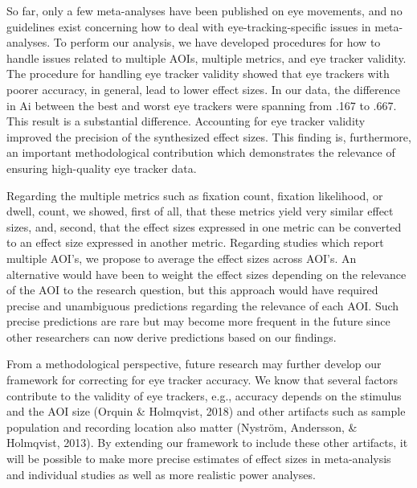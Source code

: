 \documentclass{article}
\begin{document}

So far, only a few meta-analyses have been published on eye movements, and no guidelines exist concerning how to deal with eye-tracking-specific issues in meta-analyses. To perform our analysis, we have developed procedures for how to handle issues related to multiple AOIs, multiple metrics, and eye tracker validity. The procedure for handling eye tracker validity showed that eye trackers with poorer accuracy, in general, lead to lower effect sizes. In our data, the difference in Ai between the best and worst eye trackers were spanning from .167 to .667. This result is a substantial difference. Accounting for eye tracker validity improved the precision of the synthesized effect sizes. This finding is, furthermore, an important methodological contribution which demonstrates the relevance of ensuring high-quality eye tracker data.

Regarding the multiple metrics such as fixation count, fixation likelihood, or dwell, count, we showed, first of all, that these metrics yield very similar effect sizes, and, second, that the effect sizes expressed in one metric can be converted to an effect size expressed in another metric. Regarding studies which report multiple AOI's, we propose to average the effect sizes across AOI's. An alternative would have been to weight the effect sizes depending on the relevance of the AOI to the research question, but this approach would have required precise and unambiguous predictions regarding the relevance of each AOI. Such precise predictions are rare but may become more frequent in the future since other researchers can now derive predictions based on our findings.   

From a methodological perspective, future research may further develop our framework for correcting for eye tracker accuracy. We know that several factors contribute to the validity of eye trackers, e.g., accuracy depends on the stimulus and the AOI size (Orquin \& Holmqvist, 2018) and other artifacts such as sample population and recording location also matter (Nyström, Andersson, \& Holmqvist, 2013). By extending our framework to include these other artifacts, it will be possible to make more precise estimates of effect sizes in meta-analysis and individual studies as well as more realistic power analyses.   
\end{document}
